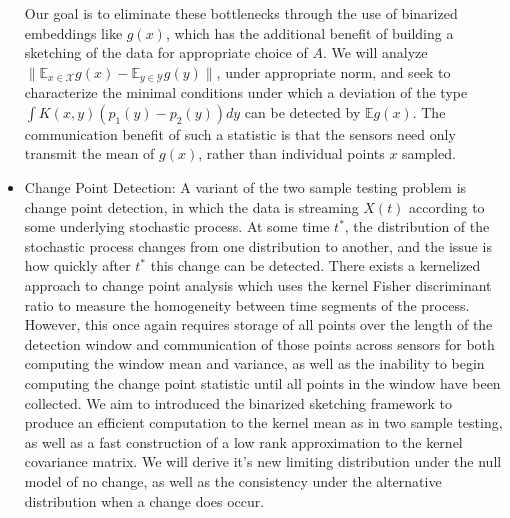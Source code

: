 \documentclass{article}
\newcommand{\comment}[3]{{\color{#1} {\bf #2 :} #3}}
\newcommand{\yoav}[1]{\comment{magenta}{Yoav}{#1}}
\begin{document}
\begin{itemize}
Our goal is to eliminate these bottlenecks through the use of binarized embeddings like $g(x)$, which has the additional benefit of building a sketching of the data for appropriate choice of $A$.  
We will analyze $\|\mathbb{E}_{x\in \mathcal{X}} g(x) - \mathbb{E}_{y\in \mathcal{Y}} g(y)\|$, under appropriate norm, and seek to characterize the minimal conditions under which a deviation of the type $\int K(x,y) (p_1(y) - p_2(y)) dy$ can be detected by $\mathbb{E} g(x)$.
The communication benefit of such a statistic is that the sensors need only transmit the mean of $g(x)$, rather than individual points $x$ sampled.  

\item Change Point Detection: A variant of the two sample testing problem is change point detection, in which the data is streaming $X(t)$ according to some underlying stochastic process.  At some time $t^*$, the distribution of the stochastic process changes from one distribution to another, and the issue is how quickly after $t^*$ this change can be detected.   There exists a kernelized approach to change point analysis \cite{Bach 2008} which uses the kernel Fisher discriminant ratio to measure the homogeneity between time segments of the process.  However, this once again requires storage of all points over the length of the detection window and communication of those points across sensors for both computing the window mean and variance, as well as the inability to begin computing the change point statistic until all points in the window have been collected.  We aim to introduced the binarized sketching framework to produce an efficient computation to the kernel mean as in two sample testing, as well as a fast construction of a low rank approximation to the kernel covariance matrix.  We will derive it's new limiting distribution under the null model of no change, as well as the consistency under the alternative distribution when a change does occur.  


\end{itemize}
\end{document}
